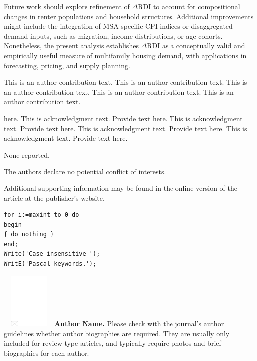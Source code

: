 \documentclass[APA,Times1COL]{WileyNJDv5} %
\begin{document}
Future work should explore refinement of \(\Delta\text{RDI}\) to account for compositional changes in renter populations and household structures. Additional improvements might include the integration of MSA-specific CPI indices or disaggregated demand inputs, such as migration, income distributions, or age cohorts. Nonetheless, the present analysis establishes \(\Delta\text{RDI}\) as a conceptually valid and empirically useful measure of multifamily housing demand, with applications in forecasting, pricing, and supply planning.


{}

This is an author contribution text. This is an author contribution text. This is an author contribution text. This is an author contribution text. This is an author contribution text.

 here. This is acknowledgment text. Provide text here. This is acknowledgment text. Provide text here. This is acknowledgment text. Provide text here. This is acknowledgment text. Provide text here.



None reported.


The authors declare no potential conflict of interests.


Additional supporting information may be found in the
online version of the article at the publisher’s website.






\begin{lstlisting}[caption={Descriptive caption text},label=DescriptiveLabel, basicstyle=\fontsize{8}{10}\selectfont\ttfamily]
for i:=maxint to 0 do
begin
{ do nothing }
end;
Write('Case insensitive ');
WritE('Pascal keywords.');
\end{lstlisting}




\nocite{*}%



\begin{biography}{\includegraphics[width=76pt,height=76pt,draft]{empty}}{
{\textbf{Author Name.} Please check with the journal's author guidelines whether
author biographies are required. They are usually only included for
review-type articles, and typically require photos and brief
biographies for each author.}}
\end{biography}
\end{document}
